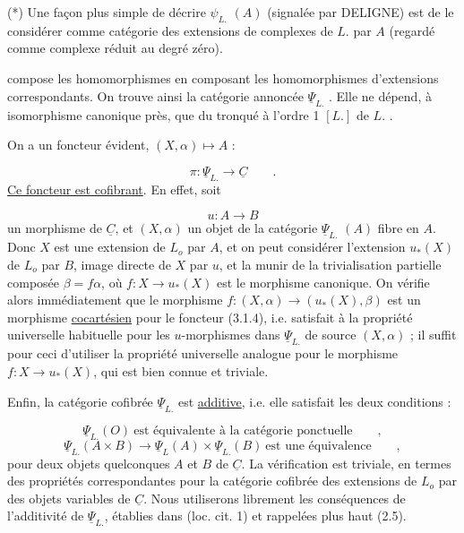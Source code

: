 (*)  Une façon plus simple de décrire  $\psi_{L.}$ $(A)$  (signalée par DELIGNE) est de le considérer comme catégorie des extensions de complexes de  $L.$  par  $A$ (regardé comme complexe réduit au degré zéro).



 compose les homomorphismes en composant les homomorphismes d'extensions correspondants. On trouve ainsi la catégorie annoncée $\underline{\Psi}_{L.}$ . Elle ne dépend, à isomorphisme canonique près, que du tronqué à l'ordre 1 $[L.]$ de $L.$ .

On a un foncteur évident, $(X,\alpha) \longmapsto A$ :

\begin{equation}\tag{3.1.4}
\pi : \underline{\Psi}_{L.} \longrightarrow \underline{C} \qquad .
\end{equation}
\underline{Ce foncteur est cofibrant}. En effet, soit

\begin{equation*}
u: A \longrightarrow B
\end{equation*}
un morphisme de $\underline{C}$, et $(X,\alpha)$ un objet de la catégorie $\underline{\Psi}_{L.}$ $(A)$ fibre en $A$. Donc $X$ est une extension de $L_o$ par $A$, et on peut considérer l'extension $u_*(X)$ de $L_o$ par $B$, image directe de $X$ par $u$, et la munir de la trivialisation partielle composée $\beta = f\alpha$, où $f : X \longrightarrow u_*(X)$ est le morphisme canonique. On vérifie alors immédiatement que le morphisme $f : (X,\alpha) \longrightarrow (u_*(X),\beta)$ est un morphisme \underline{cocartésien} pour le foncteur (3.1.4), i.e. satisfait à la propriété universelle habituelle pour les $u$-morphismes dans $\underline{\Psi}_{L.}$ de source $(X,\alpha)$ ; il suffit pour ceci d'utiliser la propriété universelle analogue pour le morphisme $f : X \longrightarrow u_*(X)$, qui est bien connue et triviale.

Enfin, la catégorie cofibrée $\underline{\Psi}_{L.}$ est \underline{additive}, i.e. elle satisfait les deux conditions :

\begin{equation}\tag{3.1.5}
\underline{\Psi}_{L.} (O) \ \text{est équivalente à la catégorie ponctuelle} \qquad ,
\end{equation}
\begin{equation}\tag{3.1.6}
\underline{\Psi}_{L.} (A \times B) \longrightarrow \underline{\Psi}_{L}(A) \times \underline{\Psi}_{L.} (B) \ \text{est une équivalence} \qquad ,
\end{equation}
pour deux objets quelconques $A$ et $B$ de $\underline{C}$. La vérification est triviale, en termes des propriétés correspondantes pour la catégorie cofibrée des extensions de $L_o$ par des objets variables de $\underline{C}$. Nous utiliserons librement
les conséquences de l'additivité de $\underline{\Psi}_{L.}$, établies dans (loc. cit. 1) et rappelées plus haut (2.5).


